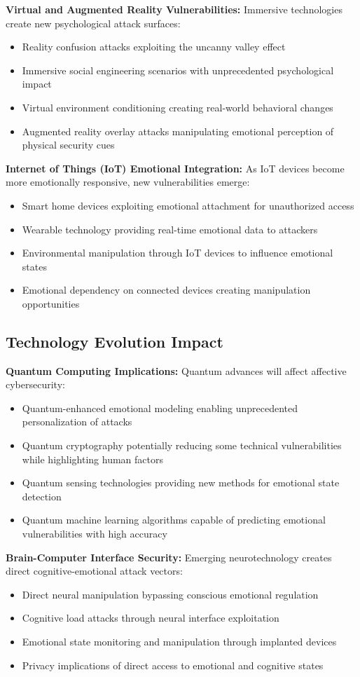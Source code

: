 \documentclass[11pt,a4paper]{article}
\begin{document}
\textbf{Virtual and Augmented Reality Vulnerabilities:}
Immersive technologies create new psychological attack surfaces:
\begin{itemize}
\item Reality confusion attacks exploiting the uncanny valley effect
\item Immersive social engineering scenarios with unprecedented psychological impact
\item Virtual environment conditioning creating real-world behavioral changes
\item Augmented reality overlay attacks manipulating emotional perception of physical security cues
\end{itemize}

\textbf{Internet of Things (IoT) Emotional Integration:}
As IoT devices become more emotionally responsive, new vulnerabilities emerge:
\begin{itemize}
\item Smart home devices exploiting emotional attachment for unauthorized access
\item Wearable technology providing real-time emotional data to attackers
\item Environmental manipulation through IoT devices to influence emotional states
\item Emotional dependency on connected devices creating manipulation opportunities
\end{itemize}

\subsection{Technology Evolution Impact}

\textbf{Quantum Computing Implications:}
Quantum advances will affect affective cybersecurity:
\begin{itemize}
\item Quantum-enhanced emotional modeling enabling unprecedented personalization of attacks
\item Quantum cryptography potentially reducing some technical vulnerabilities while highlighting human factors
\item Quantum sensing technologies providing new methods for emotional state detection
\item Quantum machine learning algorithms capable of predicting emotional vulnerabilities with high accuracy
\end{itemize}

\textbf{Brain-Computer Interface Security:}
Emerging neurotechnology creates direct cognitive-emotional attack vectors:
\begin{itemize}
\item Direct neural manipulation bypassing conscious emotional regulation
\item Cognitive load attacks through neural interface exploitation
\item Emotional state monitoring and manipulation through implanted devices
\item Privacy implications of direct access to emotional and cognitive states
\end{itemize}
\end{document}
